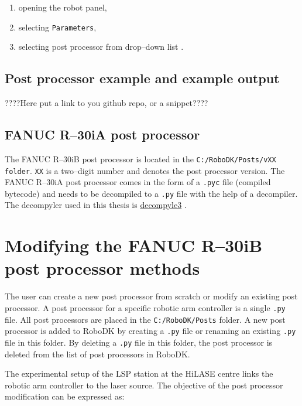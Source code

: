 \begin{enumerate}
    \item opening the robot panel,
    \item selecting \texttt{Parameters},
    \item selecting post processor from drop--down list \cite{selectpost}.
\end{enumerate}

\subsection{Post processor example and example output}

????Here put a link to you github repo, or a snippet????


\subsection{FANUC R--30iA post processor}

The FANUC R--30iB post processor is located in the \texttt{C:/RoboDK/Posts/vXX folder}. \texttt{XX} is a two--digit number and denotes the post processor version. The FANUC R--30iA post processor comes in the form of a \texttt{.pyc} file (compiled bytecode) and needs to be decompiled to a \texttt{.py} file with the help of a decompiler. The decompyler used in this thesis is   \href{https://github.com/rocky/python--decompile3}{decompyle3} \cite{decompyle3}.

\section{Modifying the FANUC R--30iB post processor methods} 

The user can create a new post processor from scratch or modify an existing post processor. A post processor for a specific robotic arm controller is a single \texttt{.py} file. All post processors are placed in the \texttt{C:/RoboDK/Posts} folder. A new post processor is added to RoboDK by creating a \texttt{.py} file or renaming an existing \texttt{.py} file in this folder. By deleting a \texttt{.py} file in this folder, the post processor is deleted from the list of post processors in RoboDK. 

The experimental setup of the LSP station at the HiLASE centre links the robotic arm controller to the laser source. The objective of the post processor modification can be expressed as:

